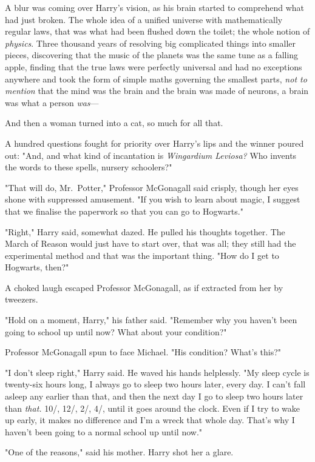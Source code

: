 A blur was coming over Harry's vision, as his brain started to comprehend what
had just broken. The whole idea of a unified universe with mathematically
regular laws, that was what had been flushed down the toilet; the whole notion
of \emph{physics}. Three thousand years of resolving big complicated things
into smaller pieces, discovering that the music of the planets was the same
tune as a falling apple, finding that the true laws were perfectly universal
and had no exceptions anywhere and took the form of simple maths governing the
smallest parts, \emph{not to mention} that the mind was the brain and the brain
was made of neurons, a brain was what a person \emph{was}\mbox{---}

And then a woman turned into a cat, so much for all that.

A hundred questions fought for priority over Harry's lips and the winner poured
out: "And, and what kind of incantation is \emph{Wingardium Leviosa?} Who
invents the words to these spells, nursery schoolers?"

"That will do, Mr.~Potter," Professor McGonagall said crisply, though her eyes
shone with suppressed amusement. "If you wish to learn about magic, I suggest
that we finalise the paperwork so that you can go to Hogwarts."

"Right," Harry said, somewhat dazed. He pulled his thoughts together. The March
of Reason would just have to start over, that was all; they still had the
experimental method and that was the important thing. "How do I get to
Hogwarts, then?"

A choked laugh escaped Professor McGonagall, as if extracted from her by
tweezers.

"Hold on a moment, Harry," his father said. "Remember why you haven't been
going to school up until now? What about your condition?"

Professor McGonagall spun to face Michael. "His condition? What's this?"

"I don't sleep right," Harry said. He waved his hands helplessly. "My sleep
cycle is twenty-six hours long, I always go to sleep two hours later, every
day. I can't fall asleep any earlier than that, and then the next day I go to
sleep two hours later than \emph{that.} 10\PM/, 12\AM/, 2\AM/, 4\AM/, until it goes
around the clock. Even if I try to wake up early, it makes no difference and
I'm a wreck that whole day. That's why I haven't been going to a normal school
up until now."

"One of the reasons," said his mother. Harry shot her a glare.

